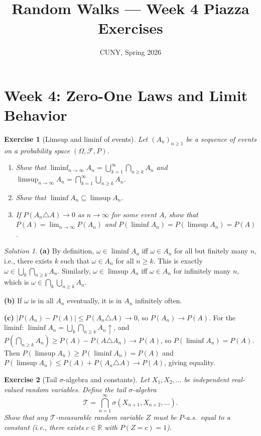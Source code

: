 \documentclass[12pt]{article}
\title{Random Walks --- Week 4 Piazza Exercises}
\author{CUNY, Spring 2026}
\date{}
\newtheorem{exercise}{Exercise}
\theoremstyle{remark}
\newtheorem*{solution}{Solution}
\begin{document}
\maketitle

\section*{Week 4: Zero-One Laws and Limit Behavior}

\begin{exercise}[Limsup and liminf of events]
Let $(A_n)_{n \ge 1}$ be a sequence of events on a probability space $(\Omega, \mathcal{F}, P)$.
\begin{enumerate}
  \item[(a)] Show that $\liminf_{n\to\infty} A_n = \bigcup_{k=1}^\infty \bigcap_{n \ge k} A_n$
             and $\limsup_{n\to\infty} A_n = \bigcap_{k=1}^\infty \bigcup_{n \ge k} A_n$.
  \item[(b)] Show that $\liminf A_n \subseteq \limsup A_n$.
  \item[(c)] If $P(A_n \triangle A) \to 0$ as $n \to \infty$ for some event $A$,
             show that $P(A) = \lim_{n\to\infty} P(A_n)$ and
             $P(\liminf A_n) = P(\limsup A_n) = P(A)$.
\end{enumerate}
\end{exercise}

\begin{solution}
\textbf{(a)} By definition, $\omega \in \liminf A_n$ iff $\omega \in A_n$ for all but
finitely many $n$, i.e., there exists $k$ such that $\omega \in A_n$ for all $n \ge k$.
This is exactly $\omega \in \bigcup_k \bigcap_{n \ge k} A_n$.  Similarly,
$\omega \in \limsup A_n$ iff $\omega \in A_n$ for infinitely many $n$, which is
$\omega \in \bigcap_k \bigcup_{n \ge k} A_n$.

\textbf{(b)} If $\omega$ is in all $A_n$ eventually, it is in $A_n$ infinitely often.

\textbf{(c)} $|P(A_n) - P(A)| \le P(A_n \triangle A) \to 0$, so $P(A_n) \to P(A)$.
For the liminf: $\liminf A_n = \bigcup_k \bigcap_{n \ge k} A_n \uparrow$, and
$P(\bigcap_{n \ge k} A_n) \ge P(A) - P(A \triangle A_n) \to P(A)$, so
$P(\liminf A_n) = P(A)$. Then $P(\limsup A_n) \ge P(\liminf A_n) = P(A)$ and
$P(\limsup A_n) \le P(A) + P(A_n \triangle A) \to P(A)$, giving equality.
\end{solution}

\begin{exercise}[Tail $\sigma$-algebra and constants]
Let $X_1, X_2, \ldots$ be independent real-valued random variables.  Define the
\emph{tail $\sigma$-algebra}
\[
  \mathcal{T} = \bigcap_{n=1}^\infty \sigma(X_{n+1}, X_{n+2}, \ldots).
\]
Show that any $\mathcal{T}$-measurable random variable $Z$ must be $P$-a.s.\ equal to
a constant (i.e., there exists $c \in \mathbb{R}$ with $P(Z = c) = 1$).
\end{exercise}
\end{document}
